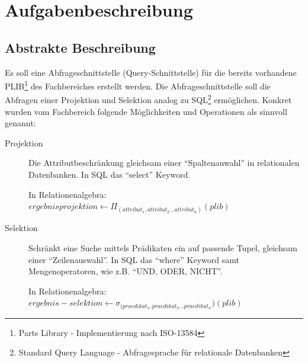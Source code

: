 \chapter{Aufgabenbeschreibung} \label{kap:aufgabenbeschreibung}

\section{Abstrakte Beschreibung}\label{sec.abstrakte_beschreibung}


Es soll eine Abfrageschnittstelle (Query-Schnittstelle) für die bereits vorhandene PLIB\footnote{Parts Library - Implementierung nach ISO-13584}  des Fachbereiches erstellt werden. Die Abfrageschnittstelle soll die Abfragen einer Projektion und Selektion analog zu SQL\footnote{Standard Query Language - Abfragesprache für relationale Datenbanken} ermöglichen. 
Konkret wurden vom Fachbereich folgende Möglichkeiten und Operationen als sinnvoll genannt:
\begin{description}
\item[Projektion] Die Attributbeschränkung gleichsam einer \enquote{Spaltenauwahl} in relationalen Datenbanken. In SQL das \enquote{select} Keyword.   

In Relationenalgebra:
$ergebnisprojektion \leftarrow  \Pi_{(attribut_1, attribut_2... attribut_n)}(plib)$ \\

\item[Selektion] Schränkt eine Suche mittels Prädikaten ein auf passende Tupel, gleichsam einer \enquote{Zeilenauswahl}. In SQL das \enquote{where} Keyword samt Mengenoperatoren, wie z.B. \enquote{UND, ODER, NICHT}.

In Relationenalgebra:
$ergebnis-selektion \leftarrow  \sigma_{(praedikat_1, praedikat_2... praedikat_n})(plib)$ \\

\end{description}
 
